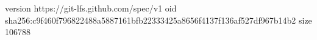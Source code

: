 version https://git-lfs.github.com/spec/v1
oid sha256:c9f460f796822488a5887161bfb22333425a8656f4137f136af527df967b14b2
size 106788
